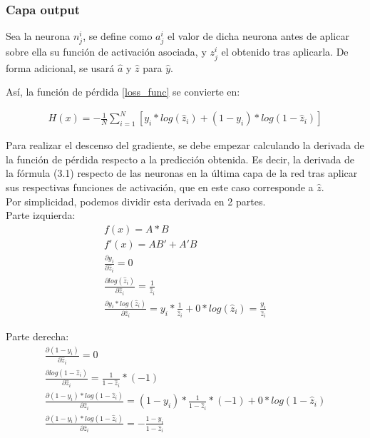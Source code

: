 \subsubsection{Capa output}

Sea la neurona $n^i_j$, se define como $a^i_j$ el valor de dicha neurona antes de aplicar sobre ella su función de activación asociada, y $z^i_j$ el obtenido tras aplicarla. De forma adicional, se usará $\hat{a}$ y $\hat{z}$ para $\hat{y}$.

Así, la función de pérdida \ref{loss_func} se convierte en:

\begin{gather}
	H(x) = - \frac{1}{N} \sum_{i=1}^{N}  [y_i * log( \hat{z}_i) + (1-y_i)*log(1-\hat{z}_i)]
	\label{loss_func_az}
\end{gather}

Para realizar el descenso del gradiente, se debe empezar calculando la derivada de la función de pérdida respecto a la predicción obtenida. Es decir, la derivada de la fórmula (3.1) respecto de las neuronas en la última capa de la red tras aplicar sus respectivas funciones de activación, que en este caso corresponde a $\hat{z}$. \\
Por simplicidad, podemos dividir esta derivada en 2 partes. \\
Parte izquierda:
\begin{gather}
	f(x) = A*B \\  
	f'(x) = AB' + A'B \\
	\frac{\partial y_i}{\partial \hat{z}_i} = 0 \\
	\frac{\partial log(\hat{z}_i)}{\partial \hat{z}_i} = \frac{1}{\hat{z}_i} \\
	\frac{\partial y_i * log( \hat{z}_i)}{\partial \hat{z}_i} = y_i*\frac{1}{\hat{z}_i} + 0*log(\hat{z}_i) = \frac{y_i}{\hat{z}_i}
\end{gather}

Parte derecha:
\begin{gather}
	\frac{\partial (1-y_i)}{\partial \hat{z}_i} = 0\\
	\frac{\partial log(1-\hat{z}_i)}{\partial \hat{z}_i} = \frac{1}{1-\hat{z}_i} * (-1) \\
	\frac{\partial (1-y_i)*log(1-\hat{z}_i)}{\partial \hat{z}_i} = (1-y_i)*\frac{1}{1-\hat{z}_i}*(-1) + 0* log(1-\hat{z}_i) \\
	\frac{\partial (1-y_i)*log(1-\hat{z}_i)}{\partial \hat{z}_i} = -\frac{1-y_i}{1-\hat{z}_i}
\end{gather}

